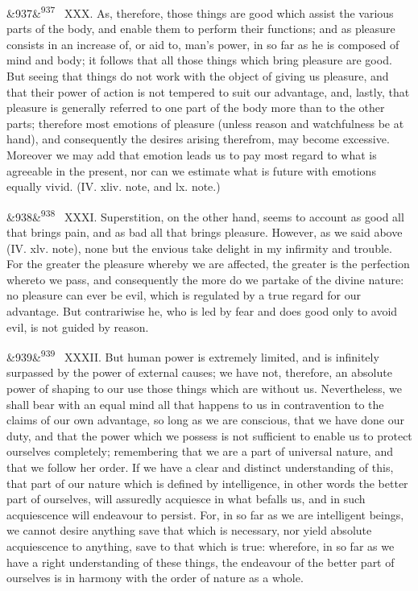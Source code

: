 \documentclass[12pt]{article}
\newcommand{\para}[1][]{\par\noindent\ifx&#1&\else\textsuperscript{\footnotesize #1}~\fi}
\begin{document}
\para[937] XXX. As, therefore, those things are good which assist the various parts of the body, and enable them to perform their functions; and as pleasure consists in an increase of, or aid to, man's power, in so far as he is composed of mind and body; it follows that all those things which bring pleasure are good. But seeing that things do not work with the object of giving us pleasure, and that their power of action is not tempered to suit our advantage, and, lastly, that pleasure is generally referred to one part of the body more than to the other parts; therefore most emotions of pleasure (unless reason and watchfulness be at hand), and consequently the desires arising therefrom, may become excessive. Moreover we may add that emotion leads us to pay most regard to what is agreeable in the present, nor can we estimate what is future with emotions equally vivid. (IV. xliv. note, and lx. note.)

\para[938] XXXI. Superstition, on the other hand, seems to account as good all that brings pain, and as bad all that brings pleasure. However, as we said above (IV. xlv. note), none but the envious take delight in my infirmity and trouble. For the greater the pleasure whereby we are affected, the greater is the perfection whereto we pass, and consequently the more do we partake of the divine nature: no pleasure can ever be evil, which is regulated by a true regard for our advantage. But contrariwise he, who is led by fear and does good only to avoid evil, is not guided by reason.

\para[939] XXXII. But human power is extremely limited, and is infinitely surpassed by the power of external causes; we have not, therefore, an absolute power of shaping to our use those things which are without us. Nevertheless, we shall bear with an equal mind all that happens to us in contravention to the claims of our own advantage, so long as we are conscious, that we have done our duty, and that the power which we possess is not sufficient to enable us to protect ourselves completely; remembering that we are a part of universal nature, and that we follow her order. If we have a clear and distinct understanding of this, that part of our nature which is defined by intelligence, in other words the better part of ourselves, will assuredly acquiesce in what befalls us, and in such acquiescence will endeavour to persist. For, in so far as we are intelligent beings, we cannot desire anything save that which is necessary, nor yield absolute acquiescence to anything, save to that which is true: wherefore, in so far as we have a right understanding of these things, the endeavour of the better part of ourselves is in harmony with the order of nature as a whole.
\end{document}
